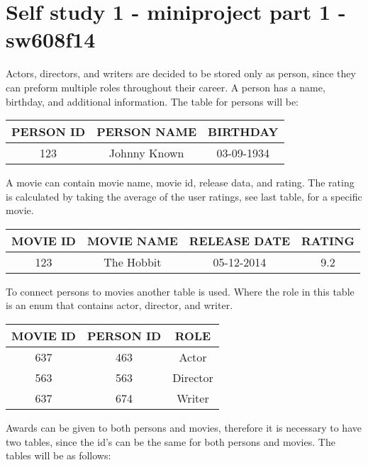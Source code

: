 \documentclass[10pt,a4paper,final]{report}
\begin{document}


\section*{Self study 1 - miniproject part 1 - sw608f14}
Actors, directors, and writers are decided to be stored only as person, since they can preform multiple roles throughout their career. A person has a name, birthday, and additional information. The table for persons will be:

\begin{table}[H] \centering
\begin{tabular}{|c|c|c|}
\hline 
PERSON ID & PERSON NAME & BIRTHDAY \\ 
\hline 
123 & Johnny Known & 03-09-1934 \\ 
\hline 
\end{tabular} 
\end{table}

A movie can contain movie name, movie id, release data, and rating. The rating is calculated by taking the average of the user ratings, see last table, for a specific movie.

\begin{table}[H] \centering
\begin{tabular}{|c|c|c|c|}
\hline 
MOVIE ID & MOVIE NAME & RELEASE DATE & RATING\\ 
\hline 
123 & The Hobbit & 05-12-2014 & 9.2\\ 
\hline 
\end{tabular} 
\end{table}

To connect persons to movies another table is used. Where the role in this table is an enum that contains actor, director, and writer.

\begin{table}[H] \centering
\begin{tabular}{|c|c|c|}
\hline 
MOVIE ID & PERSON ID & ROLE \\ 
\hline 
637 & 463 & Actor \\ 
\hline 
563 & 563 & Director \\ 
\hline 
637 & 674 & Writer \\ 
\hline 
\end{tabular}
\end{table}

Awards can be given to both persons and movies, therefore it is necessary to have two tables, since the id's can be the same for both persons and movies. The tables will be as follows:
\end{document}
